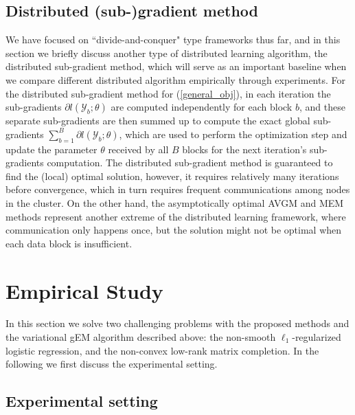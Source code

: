 \documentclass{article}
\newcommand{\1}[0]{\ensuremath{\boldsymbol{1}}\xspace}
\begin{document}
\subsection{Distributed (sub-)gradient method}
We have focused on ``divide-and-conquer" type frameworks thus far, and in this section we briefly discuss another type of distributed learning algorithm, the distributed sub-gradient method, which will serve as an important baseline when we compare different distributed algorithm empirically through experiments. For the distributed sub-gradient method for (\ref{general_obj}), in each iteration the sub-gradients $\partial l(\mathcal{Y}_b; \theta)$ are computed independently for each block $b$, and these separate sub-gradients are then summed up to compute the exact global sub-gradients $\textstyle\sum_{b=1}^B\partial l(\mathcal{Y}_b; \theta)$, which are used to perform the optimization step and update the parameter $\theta$ received by all $B$ blocks for the next iteration's sub-gradients computation. The distributed sub-gradient method is guaranteed to find the (local) optimal solution, however, it requires relatively many iterations before convergence, which in turn requires frequent communications among nodes in the cluster. On the other hand, the asymptotically optimal AVGM and MEM methods represent another extreme of the distributed learning framework, where communication only happens once, but the solution might not be optimal when each data block is insufficient.

\section{Empirical Study\label{results}}
In this section we solve two challenging problems with the proposed methods and the variational gEM algorithm described above: the non-smooth $\ell_1$-regularized logistic regression, and the non-convex low-rank matrix completion. In the following we first discuss the experimental setting.

\subsection{Experimental setting}
\end{document}
